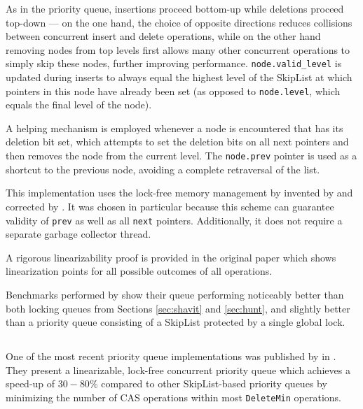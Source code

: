 \documentclass[a4paper,10pt]{article}
\begin{document}
As in the \citeauthor{shavit2000skiplist} priority queue, insertions proceed bottom-up while
deletions proceed top-down --- on the one hand, the choice of opposite directions reduces collisions
between concurrent insert and delete operations, while on the other hand removing nodes from top levels first
allows many other concurrent operations to simply skip these nodes, further improving performance.
\lstinline|node.valid_level| is updated during inserts to always equal the highest level of the SkipList
at which pointers in this node have already been set (as opposed to \lstinline|node.level|, which equals
the final level of the node).

A helping mechanism is employed whenever a node is encountered that has its deletion bit set, which attempts
to set the deletion bits on all next pointers and then removes the node from the current level. The
\lstinline|node.prev| pointer is used as a shortcut to the previous node, avoiding a complete retraversal
of the list.


This implementation uses the lock-free memory management by invented by \citeauthor{valois1996lock}
\cite{valois1995lock,valois1996lock} and corrected by \citeauthor{michael1995correction} 
\cite{michael1995correction}. It was chosen in particular because this scheme can guarantee validity
of \lstinline|prev| as well as all \lstinline|next| pointers. Additionally, it does not require a separate
garbage collector thread.

A rigorous linearizability proof is provided in the original paper \cite{sundell2003fast} which shows
linearization points for all possible outcomes of all operations.


Benchmarks performed by \citeauthor{sundell2003fast} show their queue performing noticeably better than both locking 
queues from Sections \ref{sec:shavit} and \ref{sec:hunt}, and slightly better than a priority queue
consisting of a SkipList protected by a single global lock.

\subsection{\citeauthor{linden2013skiplist}} \label{sec:linden}

One of the most recent priority queue implementations was published by \citeauthor{linden2013skiplist}
in \citeyear{linden2013skiplist} \cite{linden2013skiplist}. They present a linearizable, lock-free concurrent priority
queue which achieves a speed-up of $30-80\%$ compared to other SkipList-based priority queues by
minimizing the number of \ac{CAS} operations within most \lstinline|DeleteMin| operations.
\end{document}

